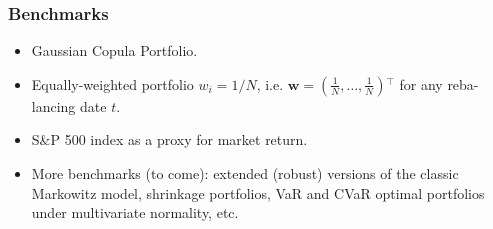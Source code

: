 \documentclass[pdf,10pt,xcolor=dvipsnames,hide notes]{beamer}
\begin{document}
\begin{frame}[label=frame7]
\frametitle{Benchmarks}

\begin{itemize}
\justifying
\setlength{\parskip}{15pt}

\item Gaussian Copula Portfolio.

\item Equally-weighted portfolio $w_{i} = 1/N$, i.e. $\mathbf{w=}\left( \frac{1}{N},\ldots,\frac{1}{N}\right) {^{\top }}$ for
any reba-lancing date $t$.

\item S\&P 500 index as a proxy for market return.

\item More benchmarks (to come): extended (robust) versions of the classic Markowitz model, shrinkage portfolios, VaR and CVaR optimal portfolios under multivariate normality, etc. 



\end{itemize}

\end{frame}

%
%
%
%	
%	
%	
%	
%	
%
\end{document}
